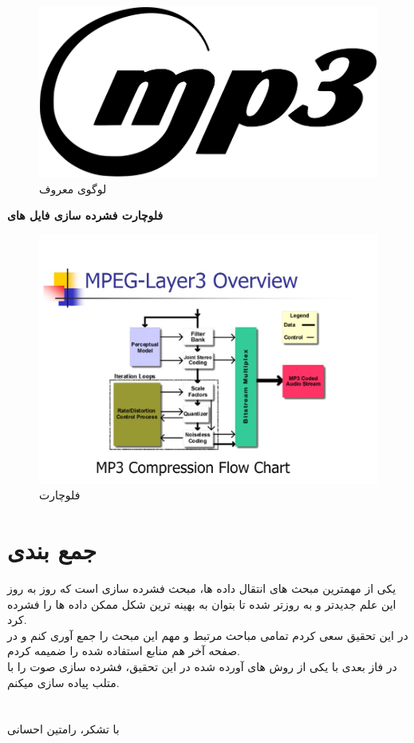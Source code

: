 \begin{figure}[H]
    \centering
    \includegraphics[width=0.5\linewidth]{images/Mp3.png}
    \caption{لوگوی معروف }
    \label{fig:mesal40}
\end{figure}

\textbf{فلوچارت فشرده سازی فایل های }
\begin{figure}[H]
    \centering
    \includegraphics[width=1\linewidth]{images/mp3.JPG}
    \caption{ فلوچارت }
    \label{fig:mesal41}
\end{figure}

\section{جمع بندی}
یکی از مهمترین مبحث های انتقال داده ها، مبحث فشرده سازی است که 
روز به روز این علم جدیدتر و به روزتر شده تا بتوان به بهینه ترین شکل ممکن داده ها را فشرده کرد.
\\
در این تحقیق سعی کردم تمامی مباحث مرتبط و مهم این مبحث را جمع آوری کنم و در صفحه آخر هم منابع استفاده شده را ضمیمه کردم.
\\
در فاز بعدی با یکی از روش های آورده شده در این تحقیق، فشرده سازی صوت را با متلب پیاده سازی میکنم.
\\
\\
\\
با تشکر، رامتین احسانی
\nocite{*}
